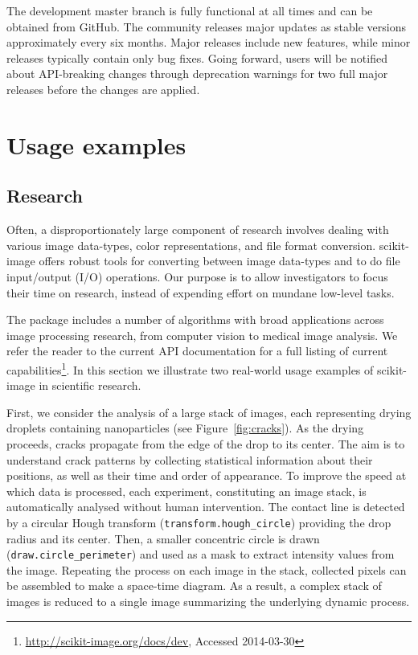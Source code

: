 \documentclass[fleqn,12pt]{wlpeerj}
\begin{document}
The development master branch is fully functional at all times and can be obtained from GitHub. The community releases major updates as stable versions approximately every six months. Major releases include new features, while minor releases typically contain only bug fixes. Going forward, users will be notified about API-breaking changes through deprecation warnings for two full major releases before the changes are applied.


\section*{Usage examples}
\label{sec:usage-examples}


\subsection*{Research}
\label{sub:research}

Often, a disproportionately large component of research involves dealing with various image data-types, color representations, and file format conversion. scikit-image offers robust tools for converting between image data-types \citep{DirectX,OpenGL,GraphicsGemsI} and to do file input/output (I/O) operations.  Our purpose is to allow investigators to focus their time on research, instead of expending effort on mundane low-level tasks.

The package includes a number of algorithms with broad applications across image processing research, from computer vision to medical image analysis. We refer the reader to the current API documentation for a full listing of current capabilities\footnote{\url{http://scikit-image.org/docs/dev}, Accessed 2014-03-30}. In this section we illustrate two real-world usage examples of scikit-image in scientific research.

First, we consider the analysis of a large stack of images, each representing drying droplets containing nanoparticles (see Figure~\ref{fig:cracks}). As the drying proceeds, cracks propagate from the edge of the drop to its center. The aim is to understand crack patterns by collecting statistical information about their positions, as well as their time and order of appearance. To improve the speed at which data is processed, each experiment, constituting an image stack, is automatically analysed without human intervention. The contact line is detected by a circular Hough transform (\texttt{transform.hough\_circle}) providing the drop radius and its center. Then, a smaller concentric circle is drawn (\texttt{draw.circle\_perimeter}) and used as a mask to extract intensity values from the image. Repeating the process on each image in the stack, collected pixels can be assembled to make a space-time diagram. As a result, a complex stack of images is reduced to a single image summarizing the underlying dynamic process.
\end{document}
